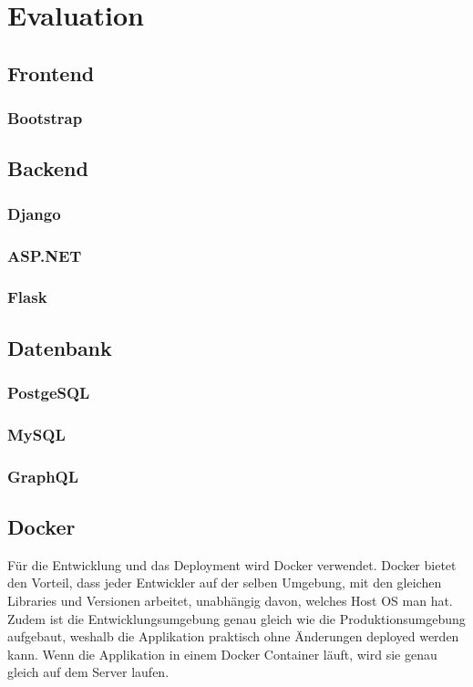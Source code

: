 \section{Evaluation}
\subsection{Frontend}
\subsubsection{Bootstrap}


\subsection{Backend}
\subsubsection{Django}


\subsubsection{ASP.NET}
\subsubsection{Flask}


\subsection{Datenbank}
\subsubsection{PostgeSQL}
\subsubsection{MySQL}
\subsubsection{GraphQL}

\subsection{Docker}
Für die Entwicklung und das Deployment wird Docker verwendet. Docker bietet den Vorteil, dass jeder Entwickler auf der selben Umgebung, mit den gleichen Libraries und Versionen arbeitet, unabhängig davon, welches Host OS man hat. Zudem ist die Entwicklungsumgebung genau gleich wie die Produktionsumgebung aufgebaut, weshalb die Applikation praktisch ohne Änderungen deployed werden kann. Wenn die Applikation in einem Docker Container läuft, wird sie genau gleich auf dem Server laufen.


\newpage